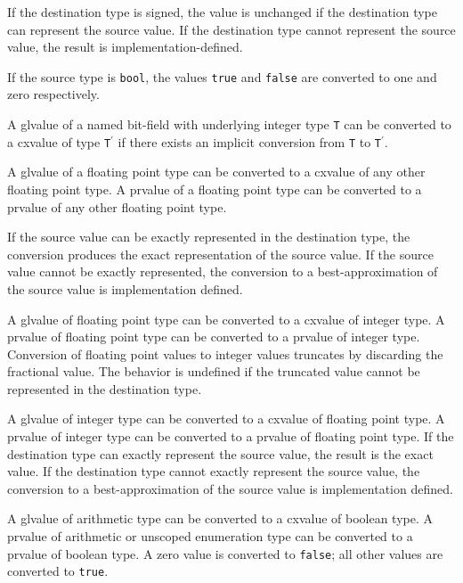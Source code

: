 \p If the destination type is signed, the value is unchanged if the destination
type can represent the source value. If the destination type cannot represent
the source value, the result is implementation-defined.

\p If the source type is \texttt{bool}, the values \texttt{true} and
\texttt{false} are converted to one and zero respectively.


\p A glvalue of a named bit-field with underlying integer type \texttt{T} can be
converted to a cxvalue of type \texttt{T$^\prime$} if there exists an implicit
conversion from \texttt{T} to \texttt{T$^\prime$}.


\p A glvalue of a floating point type can be converted to a cxvalue of any other
floating point type. A prvalue of a floating point type can be converted to a
prvalue of any other floating point type.

\p If the source value can be exactly represented in the destination type, the
conversion produces the exact representation of the source value. If the source
value cannot be exactly represented, the conversion to a best-approximation of
the source value is implementation defined.


\p A glvalue of floating point type can be converted to a cxvalue of integer
type. A prvalue of floating point type can be converted to a prvalue of integer
type. Conversion of floating point values to integer values truncates by
discarding the fractional value. The behavior is undefined if the truncated
value cannot be represented in the destination type.

\p A glvalue of integer type can be converted to a cxvalue of floating point
type. A prvalue of integer type can be converted to a prvalue of floating point
type. If the destination type can exactly represent the source value, the result
is the exact value. If the destination type cannot exactly represent the source
value, the conversion to a best-approximation of the source value is
implementation defined.


\p A glvalue of arithmetic type can be converted to a cxvalue of boolean type. A
prvalue of arithmetic or unscoped enumeration type can be converted to a prvalue
of boolean type. A zero value is converted to \texttt{false}; all other values
are converted to \texttt{true}.

